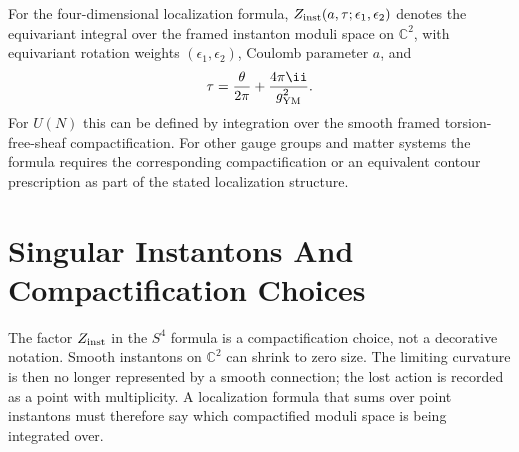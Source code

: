 \begin{definition}
\label{def:s4-nekrasov-factor}
For the four-dimensional localization formula, \(Z_{\rm inst}(a,\tau;
\epsilon_1,\epsilon_2)\) denotes the equivariant integral over the framed
instanton moduli space on \(\mathbb C^2\), with equivariant rotation weights
\((\epsilon_1,\epsilon_2)\), Coulomb parameter \(a\), and
\[
  \tau=\frac{\theta}{2\pi}+\frac{4\pi\ii}{g_{\rm YM}^2}.
\]
For \(U(N)\) this can be defined by integration over the smooth framed
torsion-free-sheaf compactification.  For other gauge groups and matter
systems the formula requires the corresponding compactification or an
equivalent contour prescription as part of the stated localization structure.
\end{definition}

\section{Singular Instantons And Compactification Choices}
\label{sec:susy-localization-singular-instantons}

The factor \(Z_{\rm inst}\) in the \(S^4\) formula is a compactification
choice, not a decorative notation.  Smooth instantons on \(\mathbb C^2\) can
shrink to zero size.  The limiting curvature is then no longer represented
by a smooth connection; the lost action is recorded as a point with
multiplicity.  A localization formula that sums over point instantons must
therefore say which compactified moduli space is being integrated over.

